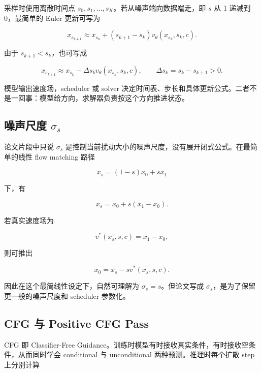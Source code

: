 采样时使用离散时间点 $s_0,s_1,\dots,s_K$。若从噪声端向数据端走，即 $s$ 从 1 递减到 0，最简单的 Euler 更新可写为

\begin{equation}
    x_{s_{k+1}} \approx x_{s_k} + (s_{k+1}-s_k)
    v_\theta(x_{s_k},s_k,c).
\end{equation}

由于 $s_{k+1}<s_k$，也可写成

\begin{equation}
    x_{s_{k+1}} \approx x_{s_k} - \Delta s_k
    v_\theta(x_{s_k},s_k,c), \qquad \Delta s_k=s_k-s_{k+1}>0.
\end{equation}

模型输出速度场，scheduler 或 solver 决定时间表、步长和具体更新公式。二者不是一回事：模型给方向，求解器负责按这个方向推进状态。

\subsection{噪声尺度 $\sigma_s$}

论文片段中只说 $\sigma_s$ 是控制当前扰动大小的噪声尺度，没有展开闭式公式。在最简单的线性 flow matching 路径

\begin{equation}
    x_s=(1-s)x_0+sx_1
\end{equation}

下，有

\begin{equation}
    x_s=x_0+s(x_1-x_0).
\end{equation}

若真实速度场为

\begin{equation}
    v^*(x_s,s,c)=x_1-x_0,
\end{equation}

则可推出

\begin{equation}
    x_0=x_s-sv^*(x_s,s,c).
\end{equation}

因此在这个最简线性设定下，自然可理解为 $\sigma_s=s$。但论文写成 $\sigma_s$，是为了保留更一般的噪声尺度和 scheduler 参数化。

\subsection{CFG 与 Positive CFG Pass}

CFG 即 Classifier-Free Guidance。训练时模型有时接收真实条件，有时接收空条件，从而同时学会 conditional 与 unconditional 两种预测。推理时每个扩散 step 上分别计算

